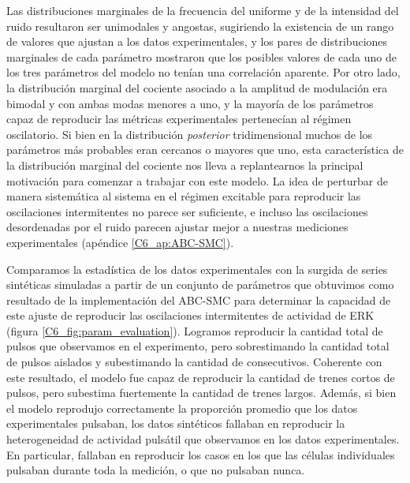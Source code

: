 \documentclass[./main.tex]{subfiles}
\begin{document}
Las distribuciones marginales de la frecuencia del uniforme y de la intensidad del ruido resultaron ser unimodales y angostas, sugiriendo la existencia de un rango de valores que ajustan a los datos experimentales, y los pares de distribuciones marginales de cada parámetro mostraron que los posibles valores de cada uno de los tres parámetros del modelo no tenían una correlación aparente. Por otro lado, la distribución marginal del cociente \xx asociado a la amplitud de modulación era bimodal y con ambas modas menores a uno, y la mayoría de los parámetros capaz de reproducir las métricas experimentales pertenecían al régimen oscilatorio. Si bien en la distribución \textit{posterior} tridimensional muchos de los parámetros más probables eran cercanos o mayores que uno, esta característica de la distribución marginal del cociente \xx nos lleva a replantearnos la principal motivación para comenzar a trabajar con este modelo. La idea de perturbar de manera sistemática al sistema en el régimen excitable para reproducir las oscilaciones intermitentes no parece ser suficiente, e incluso las oscilaciones desordenadas por el ruido parecen ajustar mejor a nuestras mediciones experimentales (apéndice \ref{C6_ap:ABC-SMC}).  



Comparamos la estadística de los datos experimentales con la surgida de series sintéticas simuladas a partir de un conjunto de parámetros que obtuvimos como resultado de la implementación del ABC-SMC para determinar la capacidad de este ajuste de reproducir las oscilaciones intermitentes de actividad de ERK (figura \ref{C6_fig:param_evaluation}). Logramos reproducir la cantidad total de pulsos que observamos en el experimento, pero sobrestimando la cantidad total de pulsos aislados y subestimando la cantidad de consecutivos. Coherente con este resultado, el modelo fue capaz de reproducir la cantidad de trenes cortos de pulsos, pero subestima fuertemente la cantidad de trenes largos. Además, si bien el modelo reprodujo correctamente la proporción promedio que los datos experimentales pulsaban, los datos sintéticos fallaban en reproducir la heterogeneidad de actividad pulsátil que observamos en los datos experimentales. En particular, fallaban en reproducir los casos en los que las células individuales pulsaban durante toda la medición, o que no pulsaban nunca. 
\end{document}
